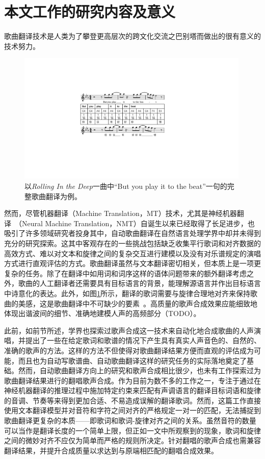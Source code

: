 \section{本文工作的研究内容及意义}
歌曲翻译技术是人类为了攀登更高层次的跨文化交流之巴别塔而做出的很有意义的技术努力。
\begin{figure}[htbp]
  \includegraphics[width=0.99\textwidth]{figure/ast/exp.pdf}
  \caption{以\textit{Rolling In the Deep}一曲中``But you play it to the beat''一句的完整歌曲翻译为例。}
  \label{fig:task_exp}
\end{figure}
然而，尽管机器翻译（Machine Translation，MT）技术，尤其是神经机器翻译~\citep{nmt,vaswani2017attention,hassan2018achieving}（Neural Machine Translation，NMT）自诞生以来已经取得了长足进步，也吸引了许多领域研究者投身其中，自动歌曲翻译在自然语言处理学界中却并未得到充分的研究探索。这其中客观存在的一些挑战包括缺乏收集平行歌词和对齐数据的高效方式、难以对文本和旋律之间的复杂交互进行建模以及没有对乐谱规定的演唱方式进行直观评估的方式。歌曲翻译虽然与文本翻译密切相关，但本质上是一项更复杂的任务。除了在翻译中如用词和词序这样的语体问题带来的额外翻译考虑之外，歌曲的人工翻译者还需要具有目标语言的背景，能理解源语言并作出目标语言中诗意化的表达。此外，如图\ref{fig:task_exp}所示，翻译的歌词需要与旋律合理地对齐来保持歌曲的美感，这是歌曲翻译中不可缺少的要素~\citep{three_d_of_singability}。高质量的歌声合成效果应能细致地体现出谐波间的细节、准确地建模人声的高频部分（TODO）。

此前，如前节所述，学界也探索过歌声合成这一技术来自动化地合成歌曲的人声演唱，并提出了一些在给定歌词和歌谱的情况下产生具有真实人声音色的、自然的、准确的歌声的方法。这样的方法不但使得对歌曲翻译结果方便而直观的评估成为可能，而且也为自动写歌谱曲、自动歌曲翻译这样的研究任务的实际落地奠定了基础。然而，自动歌曲翻译方向上的研究和歌声合成相比很少，也未有工作探索过为歌曲翻译结果进行的翻唱歌声合成。作为目前为数不多的工作之一，\citet{gagast}专注于通过在神经机器翻译的推理过程中施加特定约束来匹配有声调语言的翻译目标词语和旋律的音调、节奏等来得到更加合适、不易造成误解的翻译歌词。然而，这篇工作直接使用文本翻译模型并对音符和字符之间对齐的严格规定一对一的匹配，无法捕捉到歌曲翻译更复杂的本质——即歌词和歌词-旋律对齐之间的关系。虽然音符的数量可以当作是翻译长度的一个简单上限，但正如\citet{interplay_lyrics_melody}一文中所观察到的现象，歌词和旋律之间的微妙对齐不应仅为简单而严格的规则所决定。针对翻唱的歌声合成也需兼容翻译结果，并提升合成质量以求达到与原端相匹配的翻唱合成效果。

